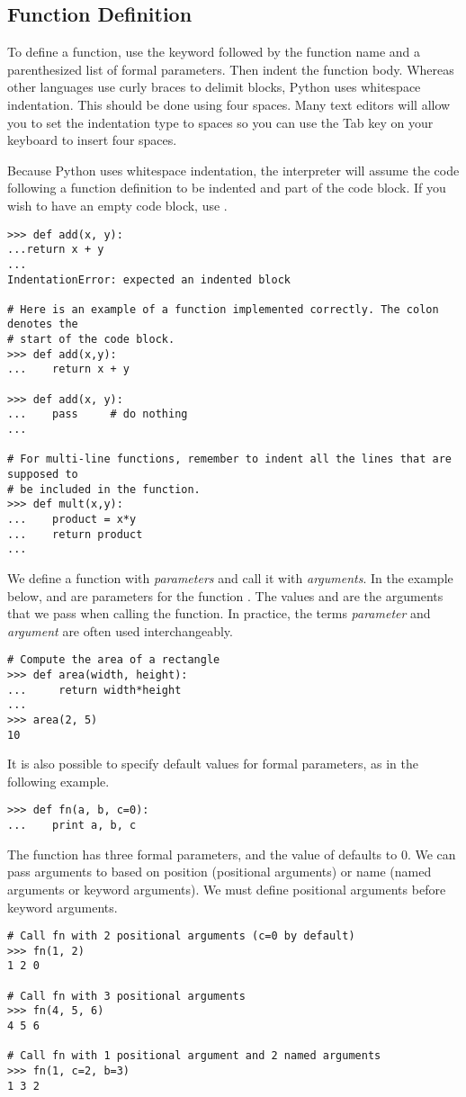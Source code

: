 
\subsection*{Function Definition}
To define a function, use the  keyword followed by the function name and a parenthesized list of formal parameters. Then indent the function body.  Whereas other languages use curly braces to delimit blocks, Python uses whitespace indentation.  This should be done using four spaces.  Many text editors will allow you to set the indentation type to spaces so you can use the Tab key on your keyboard to insert four spaces.

Because Python uses whitespace indentation, the interpreter will assume the code following a function definition to be indented and part of the code block.  If you wish to have an empty code block, use .
\begin{lstlisting}
>>> def add(x, y):
...return x + y
...
IndentationError: expected an indented block

# Here is an example of a function implemented correctly. The colon denotes the
# start of the code block.
>>> def add(x,y):
...    return x + y

>>> def add(x, y):
...    pass		# do nothing
...

# For multi-line functions, remember to indent all the lines that are supposed to
# be included in the function.
>>> def mult(x,y):
...    product = x*y
...    return product
...
\end{lstlisting}

We define a function with \emph{parameters} and call it with \emph{arguments}. In the example below,  and  are parameters for the function . The values  and  are the arguments that we pass when calling the function. In practice, the terms \emph{parameter} and \emph{argument} are often used interchangeably.

\begin{lstlisting}
# Compute the area of a rectangle
>>> def area(width, height):
...     return width*height
...         
>>> area(2, 5)
10
\end{lstlisting}

It is also possible to specify default values for formal parameters, as in the following example.
\begin{lstlisting}
>>> def fn(a, b, c=0):
...    print a, b, c
\end{lstlisting}
The function  has three formal parameters, and the value of  defaults to 0.
We can pass arguments to  based on position (positional arguments) or name (named arguments or keyword arguments). We must define positional arguments before keyword arguments.
\begin{lstlisting}
# Call fn with 2 positional arguments (c=0 by default)
>>> fn(1, 2)
1 2 0

# Call fn with 3 positional arguments
>>> fn(4, 5, 6)
4 5 6

# Call fn with 1 positional argument and 2 named arguments
>>> fn(1, c=2, b=3)
1 3 2
\end{lstlisting}

